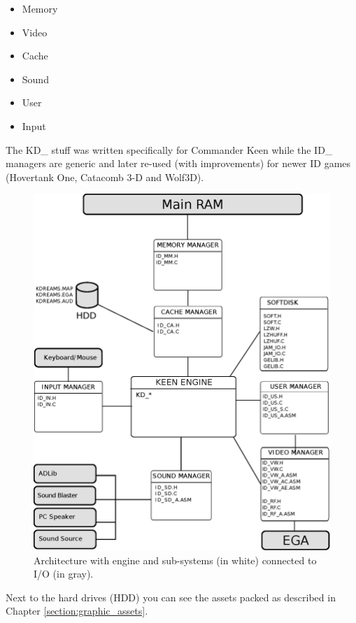 \documentclass[book.tex]{subfiles}
\begin{document}
\begin{itemize}
	\item Memory
	\item Video
	\item Cache
	\item Sound
	\item User
	\item Input
\end{itemize}
\par
The KD\_ stuff was written specifically for Commander Keen while the ID\_ managers are generic and later re-used (with improvements) for newer ID games (Hovertank One, Catacomb 3-D and Wolf3D).

\begin{figure}[H]
\centering
\includegraphics[width=\textwidth]{imgs/drawings/architecture.eps}
\caption{Architecture with engine and sub-systems (in white) connected to I/O (in gray).}
\label{fig:architecture}
\end{figure}
Next to the hard drives (HDD) you can see the assets packed as described in Chapter \ref{section:graphic_assets}.
\end{document}
